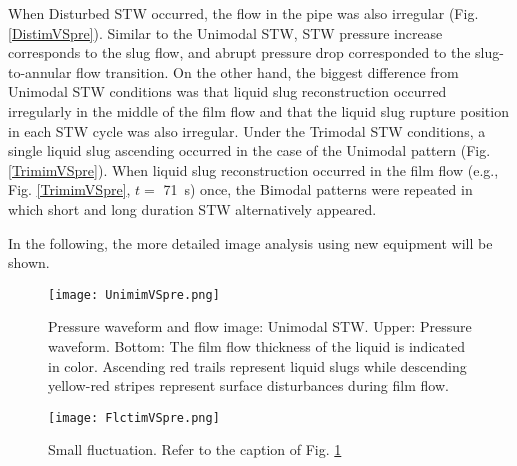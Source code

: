 \documentclass[aps,pre,preprint,groupedaddress,showkeys]{revtex4-2}
\begin{document}
When Disturbed STW occurred, the flow in the pipe was also irregular (Fig. \ref{DistimVSpre}).
Similar to the Unimodal STW, STW pressure increase corresponds to the slug flow, and abrupt pressure drop corresponded to the slug-to-annular flow transition. 
On the other hand, the biggest difference from Unimodal STW conditions was that liquid slug reconstruction occurred irregularly in the middle of the film flow and that the liquid slug rupture position in each STW cycle was also irregular.
Under the Trimodal STW conditions, a single liquid slug ascending occurred in the case of the Unimodal pattern (Fig. \ref{TrimimVSpre}).
When liquid slug reconstruction occurred in the film flow (e.g., Fig. \ref{TrimimVSpre}, $ t = $ \SI{71}{s}) once, the Bimodal patterns were repeated in which short and long duration STW alternatively appeared.

In the following, the more detailed image analysis using new equipment will be shown.

\begin{figure}
\texttt{[image: UnimimVSpre.png]} 
\caption{\label{UnimimVSpre}Pressure waveform and flow image: Unimodal STW. Upper: Pressure waveform. Bottom: The film flow thickness of the liquid is indicated in color. Ascending red trails represent liquid slugs while descending yellow-red stripes represent surface disturbances during film flow.}
\end{figure} 

\begin{figure}
\texttt{[image: FlctimVSpre.png]} 
\caption{\label{FlctimVSpre}Small fluctuation. Refer to the caption of Fig. \ref{UnimimVSpre}}
\end{figure} 
\end{document}

